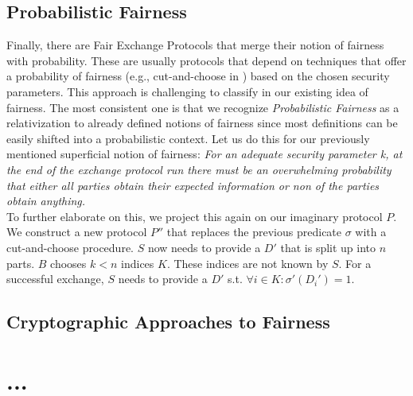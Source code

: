 \documentclass{cacthesis}
\begin{document}
        \section{Probabilistic Fairness}
        Finally, there are Fair Exchange Protocols that merge their notion of fairness with probability. These are usually protocols that depend on techniques that offer a probability of fairness (e.g., cut-and-choose in \cite{DELGADOSEGURA2020832}) based on the chosen security parameters. This approach is challenging to classify in our existing idea of fairness. The most consistent one is that we recognize \textit{Probabilistic Fairness} as a relativization to already defined notions of fairness since most definitions can be easily shifted into a probabilistic context. Let us do this for our previously mentioned superficial notion of fairness: \textit{For an adequate security parameter k, at the end of the exchange protocol run there must be an overwhelming probability that either all parties obtain their expected information or non of the parties obtain anything.} \\
        To further elaborate on this, we project this again on our imaginary protocol $P$. We construct a new protocol $P''$ that replaces the previous predicate $\sigma$ with a cut-and-choose procedure. $S$ now needs to provide a $D'$ that is split up into $n$ parts. $B$ chooses $k < n$ indices $K$. These indices are not known by $S$. For a successful exchange, $S$ needs to provide a $D'$ s.t. $\forall i\in K:\sigma'\left( D_{i}'\right) =1$.

        
        \section{Cryptographic Approaches to Fairness} %
		
	\chapter{...}
	
	\newpage
    
    
	
	\appendix
\end{document}
